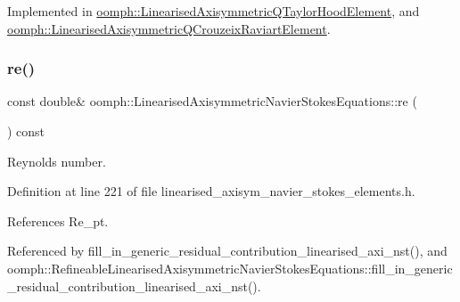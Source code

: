 Implemented in \hyperlink{classoomph_1_1LinearisedAxisymmetricQTaylorHoodElement_ab8e94bf4d8ad2e64e85b6c12bac90a8f}{oomph\+::\+Linearised\+Axisymmetric\+Q\+Taylor\+Hood\+Element}, and \hyperlink{classoomph_1_1LinearisedAxisymmetricQCrouzeixRaviartElement_a362d335bf1eeed38461e494645969ad1}{oomph\+::\+Linearised\+Axisymmetric\+Q\+Crouzeix\+Raviart\+Element}.

\mbox{\label{classoomph_1_1LinearisedAxisymmetricNavierStokesEquations_a6cbc29fea3dd2d94d546ba123976599d}} 
\subsubsection{\texorpdfstring{re()}{re()}}
{\footnotesize\ttfamily const double\& oomph\+::\+Linearised\+Axisymmetric\+Navier\+Stokes\+Equations\+::re (\begin{DoxyParamCaption}{ }\end{DoxyParamCaption}) const\hspace{0.3cm}{\ttfamily [inline]}}



Reynolds number. 



Definition at line 221 of file linearised\+\_\+axisym\+\_\+navier\+\_\+stokes\+\_\+elements.\+h.



References Re\+\_\+pt.



Referenced by fill\+\_\+in\+\_\+generic\+\_\+residual\+\_\+contribution\+\_\+linearised\+\_\+axi\+\_\+nst(), and oomph\+::\+Refineable\+Linearised\+Axisymmetric\+Navier\+Stokes\+Equations\+::fill\+\_\+in\+\_\+generic\+\_\+residual\+\_\+contribution\+\_\+linearised\+\_\+axi\+\_\+nst().

\mbox{\label{classoomph_1_1LinearisedAxisymmetricNavierStokesEquations_a13f43efc800161737d7c99e068bf9c91}} 
